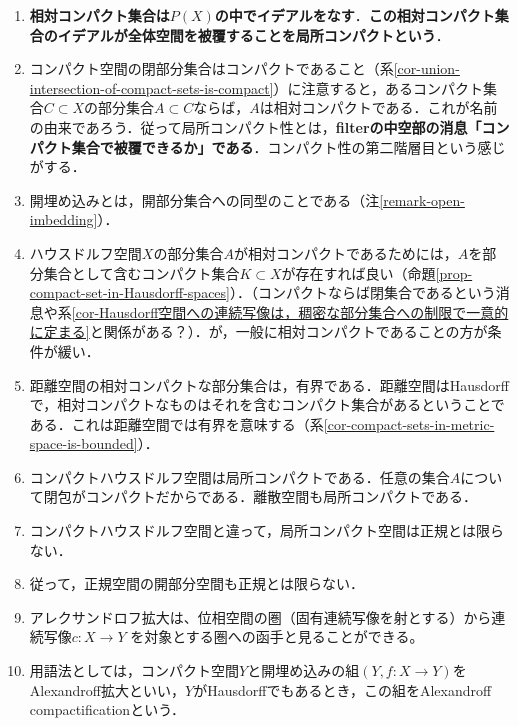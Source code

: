 \documentclass[uplatex,dvipdfmx]{jsreport}
\begin{document}
\begin{remark}\mbox{}\label{remark-locally-compact}
    \begin{enumerate}
        \item \textbf{相対コンパクト集合は$P(X)$の中でイデアルをなす}．\textbf{この相対コンパクト集合のイデアルが全体空間を被覆することを局所コンパクトという}．
        \item コンパクト空間の閉部分集合はコンパクトであること（系\ref{cor-union-intersection-of-compact-sets-is-compact}）に注意すると，あるコンパクト集合$C\subset X$の部分集合$A\subset C$ならば，$A$は相対コンパクトである．これが名前の由来であろう．従って局所コンパクト性とは，\textbf{filterの中空部の消息「コンパクト集合で被覆できるか」である}．コンパクト性の第二階層目という感じがする．
        \item 開埋め込みとは，開部分集合への同型のことである（注\ref{remark-open-imbedding}）．
        \item ハウスドルフ空間$X$の部分集合$A$が相対コンパクトであるためには，$A$を部分集合として含むコンパクト集合$K\subset X$が存在すれば良い（命題\ref{prop-compact-set-in-Hausdorff-spaces}）．（コンパクトならば閉集合であるという消息や系\ref{cor-Hausdorff空間への連続写像は，稠密な部分集合への制限で一意的に定まる}と関係がある？）．が，一般に相対コンパクトであることの方が条件が緩い．
        \item 距離空間の相対コンパクトな部分集合は，有界である．距離空間はHausdorffで，相対コンパクトなものはそれを含むコンパクト集合があるということである．これは距離空間では有界を意味する（系\ref{cor-compact-sets-in-metric-space-is-bounded}）．
        \item コンパクトハウスドルフ空間は局所コンパクトである．任意の集合$A$について閉包がコンパクトだからである．離散空間も局所コンパクトである．
        \item コンパクトハウスドルフ空間と違って，局所コンパクト空間は正規とは限らない．
        \item 従って，正規空間の開部分空間も正規とは限らない．
        \item アレクサンドロフ拡大は、位相空間の圏（固有連続写像を射とする）から連続写像$c: X \to Y$ を対象とする圏への函手と見ることができる。
        \item 用語法としては，コンパクト空間$Y$と開埋め込みの組$(Y,f:X\to Y)$をAlexandroff拡大といい，$Y$がHausdorffでもあるとき，この組をAlexandroff compactificationという．
    \end{enumerate}
\end{remark}
\end{document}
